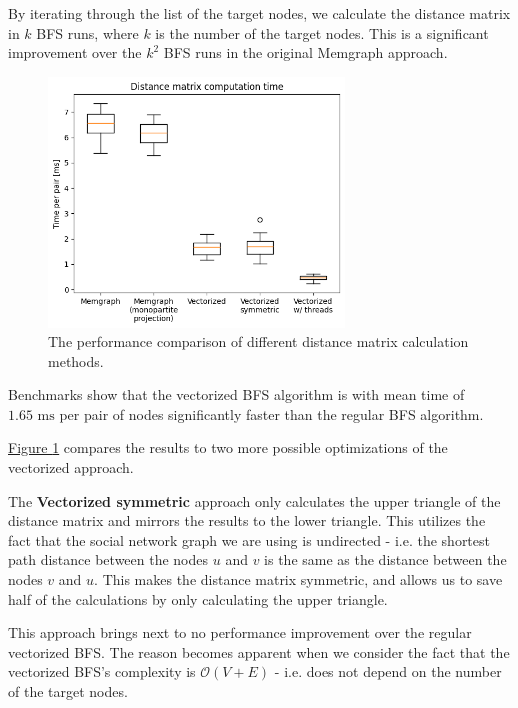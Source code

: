 By iterating through the list of the target nodes, we calculate the distance matrix in $k$ BFS runs, where $k$ is the number of the target nodes.
This is a significant improvement over the $k^2$ BFS runs in the original Memgraph approach.

\begin{figure}[ht!]
    \captionsetup{width=.9\linewidth}
    \includegraphics[width=0.7\textwidth]{../img/identity_inferrence_distance_matrix.png}
    \centering
    \caption{The performance comparison of different distance matrix calculation methods.}
    \label{fig:identity-inferrence-benchmarks}
\end{figure}

Benchmarks show that the vectorized BFS algorithm is with mean time of $1.65\text{ ms}$ per pair of nodes significantly faster than the regular BFS algorithm.

\hyperref[fig:identity-inferrence-benchmarks]{Figure \ref*{fig:identity-inferrence-benchmarks}} compares the results to two more possible optimizations of the vectorized approach.

The \textbf{Vectorized symmetric} approach only calculates the upper triangle of the distance matrix and mirrors the results to the lower triangle.
This utilizes the fact that the social network graph we are using is undirected - i.e. the shortest path distance between the nodes $u$ and $v$ is the same as the distance between the nodes $v$ and $u$.
This makes the distance matrix symmetric, and allows us to save half of the calculations by only calculating the upper triangle.

This approach brings next to no performance improvement over the regular vectorized BFS.
The reason becomes apparent when we consider the fact that the vectorized BFS's complexity is $\mathcal{O}(V + E)$ - i.e. does not depend on the number of the target nodes.


